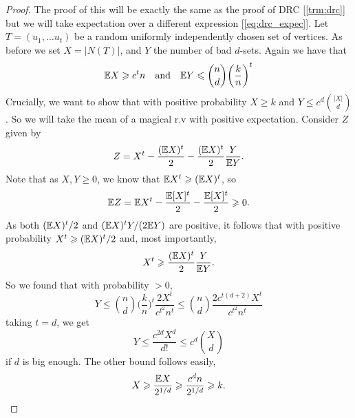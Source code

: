 \begin{proof}
	The proof of this will be exactly the same as the proof of DRC
	[\ref{trm:drc}] but we will take expectation over a different
	expression [\ref{eq:drc_expec}].
	Let $T = (u_1, \dots u_t)$ be a random uniformly independently
	chosen set of vertices. As before we set $X = |N(T)|$,
	and $Y$ the number of bad $d$-sets. Again we have that
	\[
		\mathbb{E} X \geqslant c^tn \quad \text{and} \quad \mathbb{E} Y \leqslant
		\binom{n}{d}\bigg(\frac{k}{n}\bigg)^t
	\]
	Crucially, we want to show that with positive probability $X \geq k$
	and $Y \leq c^d\binom{|X|}{d}$.
	So we will take the mean of a magical r.v with positive expectation.
	Consider $Z$ given by
	\[
		Z = X^t - \frac{(\mathbb{E} X)^t}{2} - \frac{(\mathbb{E} X)^t}{2}\frac{Y}{\mathbb{E} Y}.
	\]
	Note that as $X,Y \geq 0$, we know that $\mathbb{E} X^t \geqslant (\mathbb{E} X)^t$, so
	\[
		\mathbb{E} Z = \mathbb{E} X^t - \frac{\mathbb{E}[X]^t}{2} - \frac{\mathbb{E}[X]^t}{2} \geqslant 0.
	\]
	As both $(\mathbb{E} X)^t/2$ and $(\mathbb{E} X)^tY/(2\mathbb{E} Y)$ are positive, it
	follows that with positive probability
	$X^t \geqslant (\mathbb{E} X)^t/2$ and, most importantly,
	\[
		X^t \geqslant \frac{(\mathbb{E} X)^t}{2}\frac{Y}{\mathbb{E} Y}.
	\]
	So we found that with probability $> 0$,
	\[
		Y \leq \binom{n}{d}\bigg(\frac{k}{n}\bigg)^t\frac{2X^t}{c^{t^2}n^t}
		\leq \binom{n}{d}\frac{2c^{t(d+2)}X^t}{c^{t^2}n^t}
	\]
	taking $t = d$, we get
	\[
		Y \leq \frac{c^{2d}X^d}{d!} \leq c^d \binom{X}{d}
	\]
	if $d$ is big enough.
	The other bound follows easily,
	\[
		X \geqslant \frac{\mathbb{E} X}{2^{1/d}} \geqslant \frac{c^dn}{2^{1/d}} \geqslant k.
	\]
\end{proof}

